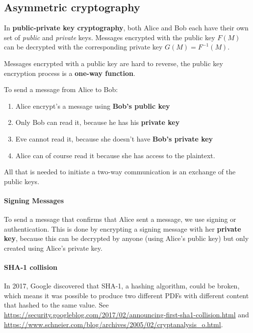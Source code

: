 \subsection{Asymmetric cryptography}

In \textbf{public-private key cryptography}, both Alice and Bob each have their own set of \textit{public} and \textit{private} keys. Messages encrypted with the public key \(F(M)\) can be decrypted with the corresponding private key \(G(M) = F^{-1}(M)\).

Messages encrypted with a public key are hard to reverse, the public key encryption process is a \textbf{one-way function}.

To send a message from Alice to Bob:

\begin{enumerate}
    \item Alice encrypt's a message using \textbf{Bob's public key}
    \item Only Bob can read it, because he has his \textbf{private key}
    \item Eve cannot read it, because she doesn't have \textbf{Bob's private key}
    \item Alice can of course read it because she has access to the plaintext.
\end{enumerate}

All that is needed to initiate a two-way communication is an exchange of the public keys.

\paragraph{Signing Messages} To send a message that confirms that Alice sent a message, we use signing or authentication. This is done by encrypting a signing message with her \textbf{private key}, because this can be decrypted by anyone (using Alice's public key) but only created using Alice's private key.

\paragraph{SHA-1 collision} In 2017, Google discovered that SHA-1, a hashing algorithm, could be broken, which means it was possible to produce two different PDFs with different content that hashed to the same value. See \url{https://security.googleblog.com/2017/02/announcing-first-sha1-collision.html} and \url{https://www.schneier.com/blog/archives/2005/02/cryptanalysis_o.html}.

